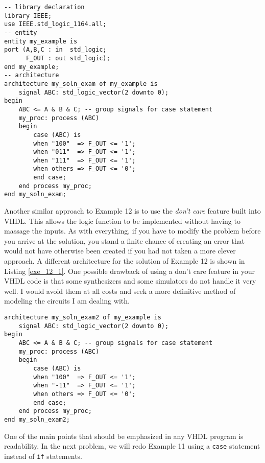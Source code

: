 \noindent
\begin{minipage}{0.99\linewidth}
\begin{lstlisting}[label=exe_12, caption=Solution to Example 12.]
-- library declaration
library IEEE;
use IEEE.std_logic_1164.all;
-- entity
entity my_example is
port (A,B,C : in  std_logic;
      F_OUT : out std_logic);
end my_example;
-- architecture
architecture my_soln_exam of my_example is
	signal ABC: std_logic_vector(2 downto 0);
begin
	ABC <= A & B & C; -- group signals for case statement
	my_proc: process (ABC)
	begin
		case (ABC) is
		when "100"  => F_OUT <= '1';
		when "011"  => F_OUT <= '1';
		when "111"  => F_OUT <= '1';
		when others => F_OUT <= '0';
		end case;
	end process my_proc;
end my_soln_exam;
\end{lstlisting}
\end{minipage}

Another similar approach to Example 12 is to use the \textit{don't care} feature built into VHDL. This allows the logic function to be implemented without having to massage the inputs. As with everything, if you have to modify the problem before you arrive at the solution, you stand a finite chance of creating an error that would not have otherwise been created if you had not taken a more clever approach. A different architecture for the solution of Example 12 is shown in Listing \ref{exe_12_1}. One possible drawback of using a don't care feature in your VHDL code is that some synthesizers and some simulators do not handle it very well. I would avoid them at all costs and seek a more definitive method of modeling the circuits I am dealing with.

\noindent
\begin{minipage}{0.99\linewidth}
\begin{lstlisting}[label=exe_12_1, caption=Alternative solution to Example 12.]
architecture my_soln_exam2 of my_example is
	signal ABC: std_logic_vector(2 downto 0);
begin
	ABC <= A & B & C; -- group signals for case statement
	my_proc: process (ABC)
	begin
		case (ABC) is
		when "100"  => F_OUT <= '1';
		when "-11"  => F_OUT <= '1';
		when others => F_OUT <= '0';
		end case;
	end process my_proc;
end my_soln_exam2;
\end{lstlisting}
\end{minipage}

One of the main points that should be emphasized in any VHDL program is readability. In the next problem, we will redo Example 11 using a \texttt{case} statement instead of \texttt{if} statements.

